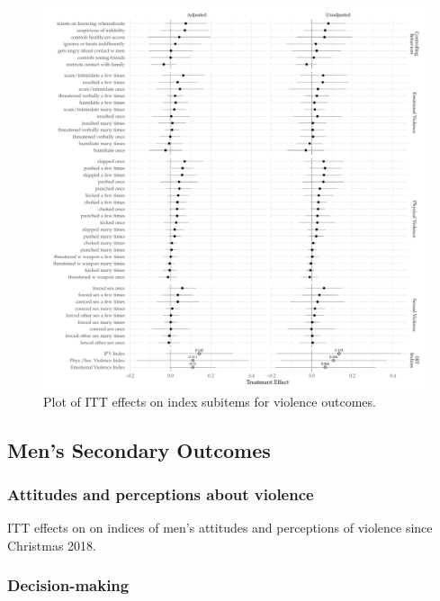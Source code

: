 \documentclass[11pt,english]{article}
\begin{document}
\begin{figure}[H]
\centering
\includegraphics[width = \textwidth]{figures/subitem_plot.pdf}
\caption{Plot of ITT effects on index subitems for violence outcomes.}
\label{fig:subitem_plot}
\end{figure}

\subsection{Men's Secondary Outcomes}

\subsubsection{Attitudes and perceptions about violence}

\begin{table}[H]
\centering

\caption{ITT effects on on indices of men's attitudes and perceptions of violence since Christmas 2018.}
\label{tab:attitudes_results_m}
\end{table}

\subsubsection{Decision-making}
\end{document}
